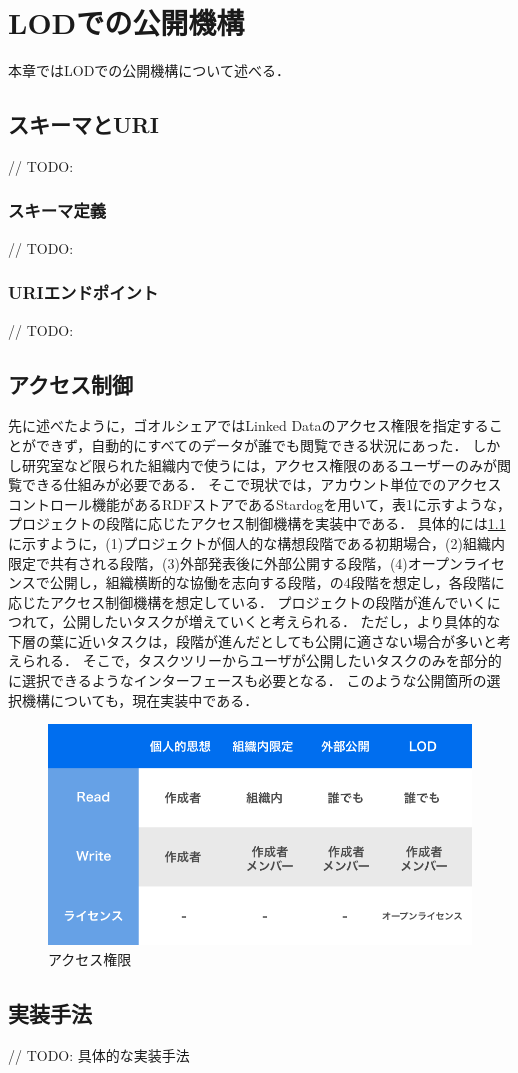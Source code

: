 \chapter{LODでの公開機構}
本章ではLODでの公開機構について述べる．

\section{スキーマとURI}
// TODO:

\subsection{スキーマ定義}
// TODO:

\subsection{URIエンドポイント}
// TODO:

\section{アクセス制御}
先に述べたように，ゴオルシェアではLinked Dataのアクセス権限を指定することができず，自動的にすべてのデータが誰でも閲覧できる状況にあった．
しかし研究室など限られた組織内で使うには，アクセス権限のあるユーザーのみが閲覧できる仕組みが必要である．
そこで現状では，アカウント単位でのアクセスコントロール機能があるRDFストアであるStardogを用いて，表1に示すような，プロジェクトの段階に応じたアクセス制御機構を実装中である．
具体的には\ref{img:permission_table}に示すように，(1)プロジェクトが個人的な構想段階である初期場合，(2)組織内限定で共有される段階，(3)外部発表後に外部公開する段階，(4)オープンライセンスで公開し，組織横断的な協働を志向する段階，の4段階を想定し，各段階に応じたアクセス制御機構を想定している．
プロジェクトの段階が進んでいくにつれて，公開したいタスクが増えていくと考えられる．
ただし，より具体的な下層の葉に近いタスクは，段階が進んだとしても公開に適さない場合が多いと考えられる．
そこで，タスクツリーからユーザが公開したいタスクのみを部分的に選択できるようなインターフェースも必要となる．
このような公開箇所の選択機構についても，現在実装中である．

\begin{figure}[t]
	\begin{center}
		\includegraphics[width=0.9\linewidth]{assets/img/permission_table.png}
		\caption{アクセス権限}
		\label{img:permission_table}
	\end{center}
\end{figure}

\section{実装手法}
// TODO: 具体的な実装手法
